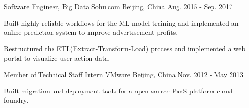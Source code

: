 \begin{cventries}
  \cventry
    {Software Engineer, Big Data} %
    {Sohu.com} %
    {Beijing, China} %
    {Aug. 2015 - Sep. 2017} %
    {
        \begin{cvitems}
          \item{Built highly reliable workflows for the ML model training and implemented an online prediction system to improve advertisement profits.}
          \item{Restructured the ETL(Extract-Transform-Load) process and implemented a web portal to visualize user action data.}
        \end{cvitems}
    }
    
  \cventry
    {Member of Technical Staff Intern} %
    {VMware} %
    {Beijing, China} %
    {Nov. 2012 - May 2013} %
    {
      \begin{cvitems}
        \item{Built migration and deployment tools for a open-source PaaS platform cloud foundry.}
      \end{cvitems}
    }

\end{cventries}
